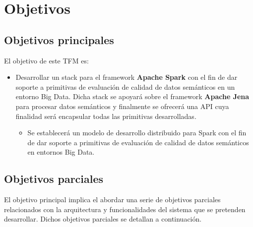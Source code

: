 \chapter{Objetivos}
\label{chap:objetivos}

\section{Objetivos principales}

El objetivo de este \acf{TFM} es:

\begin{itemize}
\item Desarrollar un stack para el framework \textbf{Apache Spark} con el fin de dar soporte a primitivas de evaluación de
  calidad de datos semánticos en un entorno Big Data. Dicha stack se apoyará
  sobre el framework \textbf{Apache Jena} para procesar datos semánticos y
  finalmente se ofrecerá una \acs{API} cuya finalidad será encapsular todas
las primitivas desarrolladas.

\begin{itemize}
\item Se establecerá un modelo de
  desarrollo distribuido para Spark con el fin de dar soporte
  a primitivas de evaluación de calidad de datos semánticos en entornos Big Data.
\end{itemize}

\end{itemize}

\section{Objetivos parciales}

El objetivo principal implica el abordar una serie de objetivos parciales
relacionados con la arquitectura y funcionalidades del sistema que se pretenden
desarrollar. Dichos objetivos parciales se detallan a continuación. 


